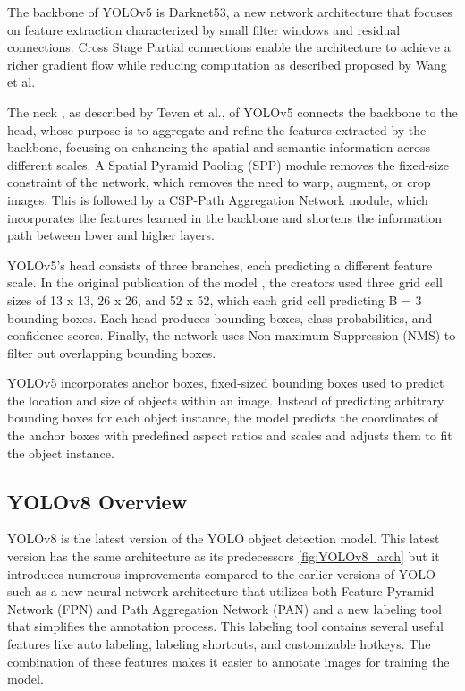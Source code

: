 \documentclass[10pt,twocolumn,letterpaper]{article}
\begin{document}
The backbone of YOLOv5 is Darknet53, a new network architecture that focuses on feature extraction characterized by small filter windows and residual connections. Cross Stage Partial connections enable the architecture to achieve a richer gradient flow while reducing computation as described \cite{cspNET} proposed by Wang et al. 

The neck \cite{CompReview}, as described by Teven et al., of YOLOv5 connects the backbone to the head, whose purpose is to aggregate and refine the features extracted by the backbone, focusing on enhancing the spatial and semantic information across different scales. A Spatial Pyramid Pooling (SPP) \cite{SPP} module removes the fixed-size constraint of the network, which removes the need to warp, augment, or crop images. This is followed by a CSP-Path Aggregation Network \cite{cspNET} module, which incorporates the features learned in the backbone and shortens the information path between lower and higher layers.

YOLOv5’s head consists of three branches, each predicting a different feature scale. In the original publication of the model \cite{YOLOv5Doc}, the creators used three grid cell sizes of 13 x 13, 26 x 26, and 52 x 52, which each grid cell predicting B = 3 bounding boxes. Each head produces bounding boxes, class probabilities, and confidence scores. Finally, the network uses Non-maximum Suppression (NMS) \cite{NMS} to filter out overlapping bounding boxes.

YOLOv5 incorporates anchor boxes, fixed-sized bounding boxes used to predict the location and size of objects within an image. Instead of predicting arbitrary bounding boxes for each object instance, the model predicts the coordinates of the anchor boxes with predefined aspect ratios and scales and adjusts them to fit the object instance.

\subsection{YOLOv8 Overview}
YOLOv8 is the latest version of the YOLO object detection model. This latest version has the same architecture as its predecessors \ref{fig:YOLOv8_arch} but it introduces numerous improvements compared to the earlier versions of YOLO such as a new neural network architecture that utilizes both Feature Pyramid Network (FPN) and Path Aggregation Network (PAN) and a new labeling tool that simplifies the annotation process. This labeling tool contains several useful features like auto labeling, labeling shortcuts, and customizable hotkeys. The combination of these features makes it easier to annotate images for training the model.
\end{document}
